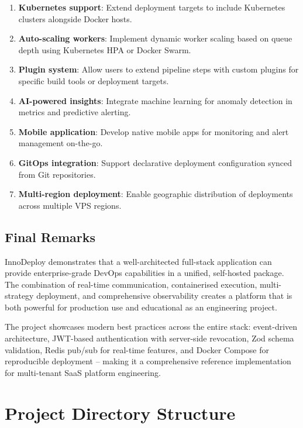 \documentclass[12pt,a4paper,twoside]{report}
\begin{document}
\begin{enumerate}
  \item \textbf{Kubernetes support}: Extend deployment targets to include Kubernetes clusters alongside Docker hosts.
  \item \textbf{Auto-scaling workers}: Implement dynamic worker scaling based on queue depth using Kubernetes HPA or Docker Swarm.
  \item \textbf{Plugin system}: Allow users to extend pipeline steps with custom plugins for specific build tools or deployment targets.
  \item \textbf{AI-powered insights}: Integrate machine learning for anomaly detection in metrics and predictive alerting.
  \item \textbf{Mobile application}: Develop native mobile apps for monitoring and alert management on-the-go.
  \item \textbf{GitOps integration}: Support declarative deployment configuration synced from Git repositories.
  \item \textbf{Multi-region deployment}: Enable geographic distribution of deployments across multiple VPS regions.
\end{enumerate}

\section{Final Remarks}

InnoDeploy demonstrates that a well-architected full-stack application can provide enterprise-grade DevOps capabilities in a unified, self-hosted package. The combination of real-time communication, containerised execution, multi-strategy deployment, and comprehensive observability creates a platform that is both powerful for production use and educational as an engineering project.

The project showcases modern best practices across the entire stack: event-driven architecture, JWT-based authentication with server-side revocation, Zod schema validation, Redis pub/sub for real-time features, and Docker Compose for reproducible deployment -- making it a comprehensive reference implementation for multi-tenant SaaS platform engineering.


\appendix

\chapter{Project Directory Structure}
\end{document}
